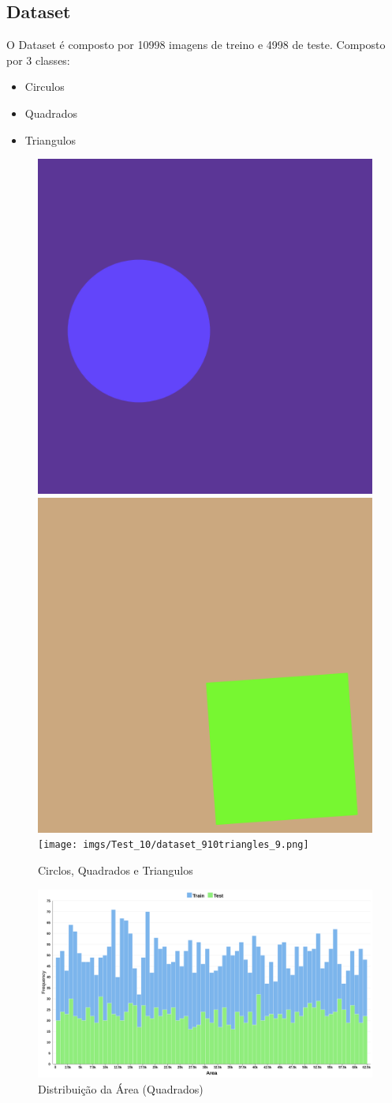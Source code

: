 \subsection{Dataset}
    O Dataset é composto por 10998 imagens de treino e 4998 de teste. Composto por 3 classes: 
    \begin{itemize}
        \item Circulos 
        \item Quadrados
        \item Triangulos
    \end{itemize}
    \begin{figure}[H]
        \centering
        \includegraphics[width=0.25\linewidth]{imgs/Test_10/dataset_10/circles_9.png}
        \includegraphics[width=0.25\linewidth]{imgs/Test_10/dataset_10/squares_9.png}
        \texttt{[image: imgs/Test\_10/dataset\_910triangles\_9.png]}
        \caption{Circlos, Quadrados e Triangulos}
        \label{fig:enter-label}
    \end{figure}
    \begin{figure}[H]
        \centering
        \includegraphics[width=1.0\linewidth]{imgs/Test_9/dataset_9/Squares_Area_Distribution_Hist.png}
        \caption{Distribuição da Área (Quadrados)}
        \label{fig:enter-label}
    \end{figure}
